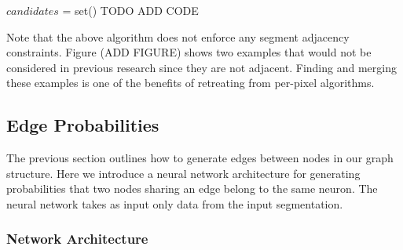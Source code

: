 \begin{algorithmic}
			\State $candidates$ = set()
				\State TODO ADD CODE
			\EndFor
		\EndFor
	\EndFunction
\end{algorithmic}

Note that the above algorithm does not enforce any segment adjacency constraints.
Figure (ADD FIGURE) shows two examples that would not be considered in previous research since they are not adjacent.
Finding and merging these examples is one of the benefits of retreating from per-pixel algorithms. 

\subsection{Edge Probabilities}

The previous section outlines how to generate edges between nodes in our graph structure. 
Here we introduce a neural network architecture for generating probabilities that two nodes sharing an edge belong to the same neuron. 
The neural network takes as input only data from the input segmentation. 

\subsubsection{Network Architecture}

